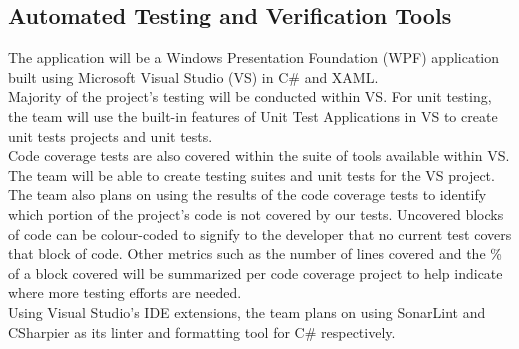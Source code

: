 \documentclass[12pt, titlepage]{article}
\begin{document}
 



\subsection{Automated Testing and Verification Tools}

The application will be a Windows Presentation Foundation (WPF) application built using Microsoft Visual Studio (VS) in C\# and XAML. \\

\noindent Majority of the project's testing will be conducted within VS. 
For unit testing, the team will use the built-in features of Unit Test Applications in VS to create unit tests projects and unit tests.\\

\noindent Code coverage tests are also covered within the suite of tools available within VS. The team will be able to create testing suites and 
unit tests for the VS project. The team also plans on using the results of the code coverage
tests to identify which portion of the project's code is not covered by our tests. Uncovered blocks of code can be colour-coded to signify to 
the developer that no current test covers that block of code. Other metrics such as the number of lines covered and the \% of a block covered will be 
summarized per code coverage project to help indicate where more testing efforts are needed. \\

\noindent Using Visual Studio's IDE extensions, the team plans on using SonarLint and CSharpier as its linter and formatting tool for C\# respectively. 

\end{document}
